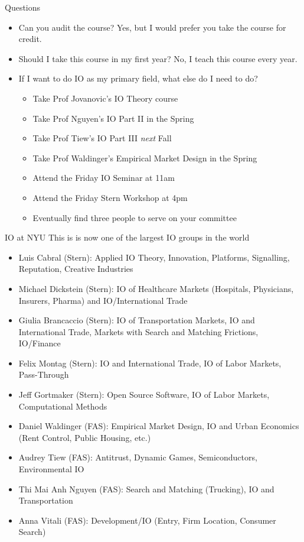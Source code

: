 \documentclass[aspectratio=169,11pt]{beamer}
\begin{document}
\begin{frame}{Questions}
\begin{itemize}
    \item Can you audit the course? Yes, but I would prefer you take the course for credit.
    \item Should I take this course in my first year? No, I teach this course every year.
    \item If I want to do IO as my primary field, what else do I need to do?
    \begin{itemize}
        \item Take Prof Jovanovic's IO Theory course
        \item Take Prof Nguyen's IO Part II in the Spring
        \item Take Prof Tiew's IO Part III \emph{next} Fall
        \item Take Prof Waldinger's Empirical Market Design in the Spring
        \item Attend the Friday IO Seminar at 11am
        \item Attend the Friday Stern Workshop at 4pm
        \item Eventually find three people to serve on your committee
    \end{itemize}
\end{itemize}
\end{frame}



\begin{frame}{IO at NYU}
This is is now one of the largest IO groups in the world
\begin{itemize}
    \item Luis Cabral (Stern): Applied IO Theory, Innovation, Platforms, Signalling, Reputation, Creative Industries
    \item Michael Dickstein (Stern): IO of Healthcare Markets (Hospitals, Physicians, Insurers, Pharma) and IO/International Trade
    \item Giulia Brancaccio (Stern): IO of Transportation Markets, IO and International Trade, Markets with Search and Matching Frictions, IO/Finance
    \item Felix Montag (Stern): IO and International Trade, IO of Labor Markets, Pass-Through
    \item Jeff Gortmaker (Stern): Open Source Software, IO of Labor Markets, Computational Methods
    \item Daniel Waldinger (FAS): Empirical Market Design, IO and Urban Economics (Rent Control, Public Housing, etc.)
    \item Audrey Tiew (FAS): Antitrust, Dynamic Games, Semiconductors, Environmental IO
    \item Thi Mai Anh Nguyen (FAS): Search and Matching (Trucking), IO and Transportation
    \item Anna Vitali (FAS): Development/IO (Entry, Firm Location, Consumer Search)
\end{itemize}
\end{frame}
\end{document}
